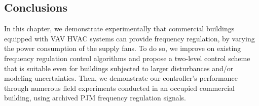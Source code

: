 \subsection{Conclusions}\label{sec:conclusions}
In this chapter, we demonstrate experimentally that commercial buildings equipped with VAV HVAC systems can provide frequency regulation, by varying the power consumption of the supply fans.
To do so, we improve on existing frequency regulation control algorithms and propose a two-level control scheme that is suitable even for buildings subjected to larger disturbances and/or modeling uncertainties.
Then, we demonstrate our controller's performance through numerous field experiments conducted in an occupied commercial building, using archived PJM frequency regulation signals.


